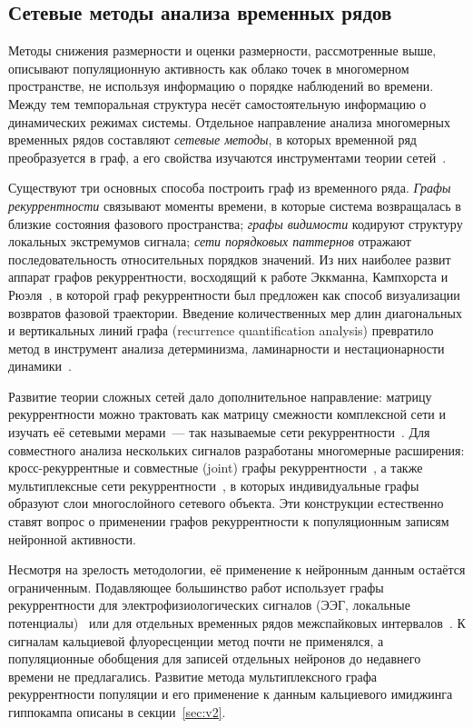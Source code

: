 
\subsection{Сетевые методы анализа временных рядов}\label{sec:network_methods}

Методы снижения размерности и оценки размерности, рассмотренные выше, описывают популяционную активность как облако точек в многомерном пространстве, не используя информацию о порядке наблюдений во времени. Между тем темпоральная структура несёт самостоятельную информацию о динамических режимах системы. Отдельное направление анализа многомерных временных рядов составляют \textit{сетевые методы}, в которых временной ряд преобразуется в граф, а его свойства изучаются инструментами теории сетей~\cite{Varley2022}.

Существуют три основных способа построить граф из временного ряда. \textit{Графы рекуррентности} связывают моменты времени, в которые система возвращалась в близкие состояния фазового пространства; \textit{графы видимости} кодируют структуру локальных экстремумов сигнала; \textit{сети порядковых паттернов} отражают последовательность относительных порядков значений. Из них наиболее развит аппарат графов рекуррентности, восходящий к работе Эккманна, Кампхорста и Рюэля~\cite{Eckmann1987}, в которой граф рекуррентности был предложен как способ визуализации возвратов фазовой траектории. Введение количественных мер длин диагональных и вертикальных линий графа (recurrence quantification analysis) превратило метод в инструмент анализа детерминизма, ламинарности и нестационарности динамики~\cite{Marwan2007}.

Развитие теории сложных сетей дало дополнительное направление: матрицу рекуррентности можно трактовать как матрицу смежности комплексной сети и изучать её сетевыми мерами~--- так называемые сети рекуррентности~\cite{Donges2012}. Для совместного анализа нескольких сигналов разработаны многомерные расширения: кросс-рекуррентные и совместные (joint) графы рекуррентности~\cite{Romano2004}, а также мультиплексные сети рекуррентности~\cite{Eroglu2018}, в которых индивидуальные графы образуют слои многослойного сетевого объекта. Эти конструкции естественно ставят вопрос о применении графов рекуррентности к популяционным записям нейронной активности.

Несмотря на зрелость методологии, её применение к нейронным данным остаётся ограниченным. Подавляющее большинство работ использует графы рекуррентности для электрофизиологических сигналов (ЭЭГ, локальные потенциалы)~\cite{Marwan2007, Acharya2011rqa} или для отдельных временных рядов межспайковых интервалов~\cite{Kaluzny1993}. К сигналам кальциевой флуоресценции метод почти не применялся, а популяционные обобщения для записей отдельных нейронов до недавнего времени не предлагались. Развитие метода мультиплексного графа рекуррентности популяции и его применение к данным кальциевого имиджинга гиппокампа описаны в секции~\ref{sec:v2}.